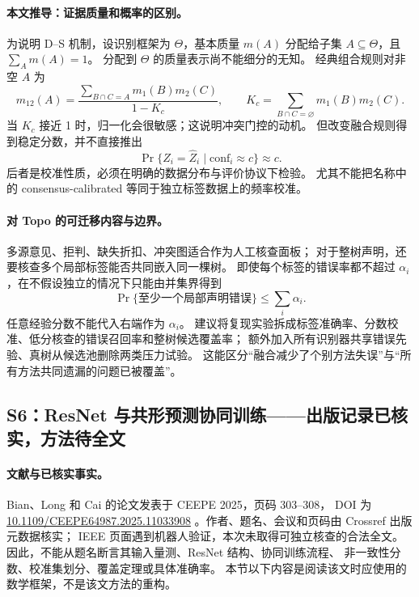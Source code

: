 \paragraph{本文推导：证据质量和概率的区别。}
为说明 D--S 机制，设识别框架为 $\Theta$，基本质量 $m(A)$ 分配给子集
$A\subseteq\Theta$，且 $\sum_A m(A)=1$。
分配到 $\Theta$ 的质量表示尚不能细分的无知。
经典组合规则对非空 $A$ 为
\begin{equation}
 m_{12}(A)=\frac{\sum_{B\cap C=A}m_1(B)m_2(C)}{1-K_c},
 \qquad K_c=\sum_{B\cap C=\varnothing}m_1(B)m_2(C).
 \label{eq:eng-ds}
\end{equation}
当 $K_c$ 接近 1 时，归一化会很敏感；这说明冲突门控的动机。
但改变融合规则得到稳定分数，并不直接推出
\begin{equation}
 \Pr\{Z_i=\widehat Z_i\mid \mathrm{conf}_i\approx c\}\approx c.
 \label{eq:eng-calibration}
\end{equation}
后者是校准性质，必须在明确的数据分布与评价协议下检验。
尤其不能把名称中的 consensus-calibrated 等同于独立标签数据上的频率校准。

\paragraph{对 Topo 的可迁移内容与边界。}
多源意见、拒判、缺失折扣、冲突图适合作为人工核查面板；
对于整树声明，还要核查多个局部标签能否共同嵌入同一棵树。
即使每个标签的错误率都不超过 $\alpha_i$，在不假设独立的情况下只能由并集界得到
\begin{equation}
 \Pr\{\text{至少一个局部声明错误}\}\leq\sum_i\alpha_i.
 \label{eq:eng-simultaneous}
\end{equation}
任意经验分数不能代入右端作为 $\alpha_i$。
建议将复现实验拆成标签准确率、分数校准、低分核查的错误召回率和整树候选覆盖率；
额外加入所有识别器共享错误先验、真树从候选池删除两类压力试验。
这能区分“融合减少了个别方法失误”与“所有方法共同遗漏的问题已被覆盖”。

\subsection{S6：ResNet 与共形预测协同训练——出版记录已核实，方法待全文}
\label{subsec:S6}

\paragraph{文献与已核实事实。}
Bian、Long 和 Cai 的论文发表于 CEEPE 2025，页码 303--308，
DOI 为 \href{https://doi.org/10.1109/CEEPE64987.2025.11033908}{10.1109/CEEPE64987.2025.11033908}
\citep{S6}。作者、题名、会议和页码由 Crossref 出版元数据核实；
IEEE 页面遇到机器人验证，本次未取得可独立核查的合法全文。
因此，不能从题名断言其输入量测、ResNet 结构、协同训练流程、
非一致性分数、校准集划分、覆盖定理或具体准确率。
本节以下内容是阅读该文时应使用的数学框架，不是该文方法的重构。

